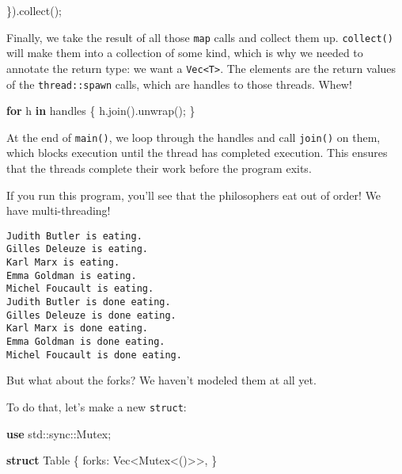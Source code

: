 \documentclass[a4paper,]{book}
\newenvironment{Shaded}{\begin{snugshade}}{\end{snugshade}}
\newcommand{\KeywordTok}[1]{\textcolor[rgb]{0.13,0.29,0.53}{\textbf{{#1}}}}
\newcommand{\DataTypeTok}[1]{\textcolor[rgb]{0.13,0.29,0.53}{{#1}}}
\newcommand{\NormalTok}[1]{{#1}}
\begin{document}
\begin{Shaded}
\begin{Highlighting}[]
\NormalTok{\}).collect();}
\end{Highlighting}
\end{Shaded}

Finally, we take the result of all those \texttt{map} calls and collect
them up. \texttt{collect()} will make them into a collection of some
kind, which is why we needed to annotate the return type: we want a
\texttt{Vec\textless{}T\textgreater{}}. The elements are the return
values of the \texttt{thread::spawn} calls, which are handles to those
threads. Whew!

\begin{Shaded}
\begin{Highlighting}[]
\KeywordTok{for} \NormalTok{h }\KeywordTok{in} \NormalTok{handles \{}
    \NormalTok{h.join().unwrap();}
\NormalTok{\}}
\end{Highlighting}
\end{Shaded}

At the end of \texttt{main()}, we loop through the handles and call
\texttt{join()} on them, which blocks execution until the thread has
completed execution. This ensures that the threads complete their work
before the program exits.

If you run this program, you'll see that the philosophers eat out of
order! We have multi-threading!

\begin{verbatim}
Judith Butler is eating.
Gilles Deleuze is eating.
Karl Marx is eating.
Emma Goldman is eating.
Michel Foucault is eating.
Judith Butler is done eating.
Gilles Deleuze is done eating.
Karl Marx is done eating.
Emma Goldman is done eating.
Michel Foucault is done eating.
\end{verbatim}

But what about the forks? We haven't modeled them at all yet.

To do that, let's make a new \texttt{struct}:

\begin{Shaded}
\begin{Highlighting}[]
\KeywordTok{use} \NormalTok{std::sync::Mutex;}

\KeywordTok{struct} \NormalTok{Table \{}
    \NormalTok{forks: }\DataTypeTok{Vec}\NormalTok{<Mutex<()>>,}
\NormalTok{\}}
\end{Highlighting}
\end{Shaded}
\end{document}
